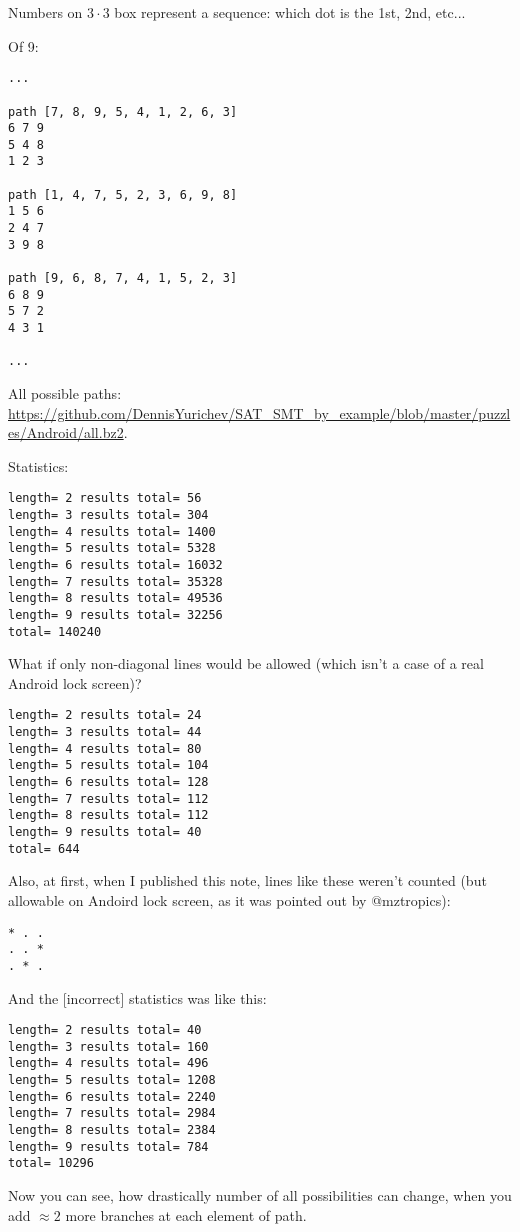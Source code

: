 Numbers on $3 \cdot 3$ box represent a sequence: which dot is the 1st, 2nd, etc...

Of 9:

\begin{lstlisting}
...

path [7, 8, 9, 5, 4, 1, 2, 6, 3]
6 7 9
5 4 8
1 2 3

path [1, 4, 7, 5, 2, 3, 6, 9, 8]
1 5 6
2 4 7
3 9 8

path [9, 6, 8, 7, 4, 1, 5, 2, 3]
6 8 9
5 7 2
4 3 1

...
\end{lstlisting}

All possible paths: \url{https://github.com/DennisYurichev/SAT_SMT_by_example/blob/master/puzzles/Android/all.bz2}.

Statistics:

\begin{lstlisting}
length= 2 results total= 56
length= 3 results total= 304
length= 4 results total= 1400
length= 5 results total= 5328
length= 6 results total= 16032
length= 7 results total= 35328
length= 8 results total= 49536
length= 9 results total= 32256
total= 140240
\end{lstlisting}

What if only non-diagonal lines would be allowed (which isn't a case of a real Android lock screen)?

\begin{lstlisting}
length= 2 results total= 24
length= 3 results total= 44
length= 4 results total= 80
length= 5 results total= 104
length= 6 results total= 128
length= 7 results total= 112
length= 8 results total= 112
length= 9 results total= 40
total= 644
\end{lstlisting}

Also, at first, when I published this note, lines like these weren't counted (but allowable on Andoird lock screen, as it was pointed out by @mztropics):

\begin{lstlisting}
* . .
. . *
. * .
\end{lstlisting}

And the [incorrect] statistics was like this:

\begin{lstlisting}
length= 2 results total= 40
length= 3 results total= 160
length= 4 results total= 496
length= 5 results total= 1208
length= 6 results total= 2240
length= 7 results total= 2984
length= 8 results total= 2384
length= 9 results total= 784
total= 10296
\end{lstlisting}

Now you can see, how drastically number of all possibilities can change, when you add $\approx 2$ more branches at each element of path.

